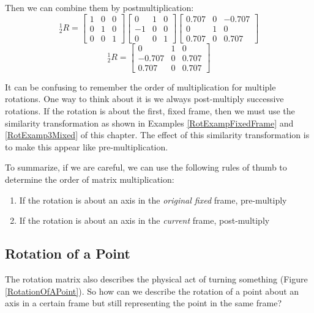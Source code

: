 \begin{Example}
Then we can combine them by postmultiplication:
\[
{^1_2R} = \begin{bmatrix}  1 & 0 & 0 \\ 0 & 1 & 0 \\ 0 & 0 & 1 \end{bmatrix}
\begin{bmatrix} 0 & 1 & 0 \\ -1 & 0 & 0 \\ 0 & 0 & 1 \end{bmatrix}
\begin{bmatrix} 0.707 & 0  & -0.707 \\ 0 & 1 & 0 \\ 0.707 & 0 & 0.707 \end{bmatrix}
\]
\[
{^1_2R} = \begin{bmatrix} 0 &  1 & 0 \\ -0.707 & 0 & 0.707 \\ 0.707 & 0 & 0.707 \end{bmatrix}
\]


\end{Example}

It can be confusing to remember the order of multiplication for multiple rotations.   One way to think about it is we always post-multiply successive rotations.  If the rotation is about the first, fixed frame, then we must use the similarity transformation as shown in Examples \ref{RotExampFixedFrame} and \ref{RotExamp3Mixed} of this chapter.  The effect of this similarity transformation is to make this appear like pre-multiplication.


To summarize, if we are careful, we can use the following rules of thumb to determine the order of matrix multiplication:

\begin{enumerate}
  \item  If the rotation is about an axis in the {\it original fixed  } frame, pre-multiply
  \item  If the rotation is about an axis in the {\it current} frame, post-multiply
\end{enumerate}



\subsection{Rotation of a Point}
The rotation matrix also describes the physical act of turning something (Figure \ref{RotationOfAPoint}).   So how can we describe the rotation of a point about an axis in a certain frame but still representing the point in the same frame?


